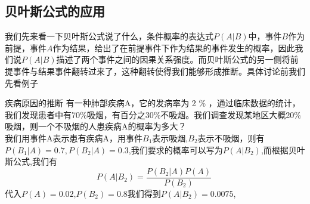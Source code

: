 \subsection{贝叶斯公式的应用}
我们先来看一下贝叶斯公式说了什么，条件概率的表达式$P(A|B)$中，事件$B$作为前提，事件$A$作为结果，给出了在前提事件下作为结果的事件发生的概率，因此我们说$P(A|B)$描述了两个事件之间的因果关系强度。而贝叶斯公式的另一侧将前提事件与结果事件翻转过来了，这种翻转使得我们能够形成推断。具体讨论前我们先看例子
\begin{example}{疾病原因的推断}
有一种肺部疾病A，它的发病率为 2 \% ，通过临床数据的统计，我们发现患者中有70\%吸烟，有百分之30\%不吸烟。我们调查发现某地区大概20\%吸烟，则一个不吸烟的人患疾病A的概率为多大？\\
我们用事件A表示患有疾病A，用事件$B_1$表示吸烟,$B_2$表示不吸烟，则有$P(B_1|A) = 0.7,P(B_2|A)=0.3$,我们要求的概率可以写为$P(A|B_2)$,而根据贝叶斯公式,我们有
\begin{equation}
P(A|B_2) = \frac{P(B_2|A) P(A)}{P(B_2)}~
\end{equation}
代入$P(A)=0.02$,$P(B_2)=0.8$我们得到$P(A|B_2) = 0.0075$,
\end{example}
